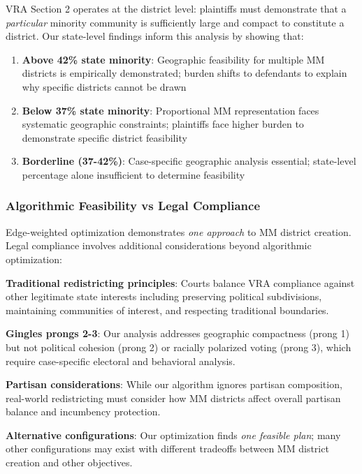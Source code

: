 VRA Section 2 operates at the district level: plaintiffs must demonstrate that a \emph{particular} minority community is sufficiently large and compact to constitute a district. Our state-level findings inform this analysis by showing that:

\begin{enumerate}
    \item \textbf{Above 42\% state minority}: Geographic feasibility for multiple MM districts is empirically demonstrated; burden shifts to defendants to explain why specific districts cannot be drawn
    \item \textbf{Below 37\% state minority}: Proportional MM representation faces systematic geographic constraints; plaintiffs face higher burden to demonstrate specific district feasibility
    \item \textbf{Borderline (37-42\%)}: Case-specific geographic analysis essential; state-level percentage alone insufficient to determine feasibility
\end{enumerate}

\subsubsection{Algorithmic Feasibility vs Legal Compliance}

Edge-weighted optimization demonstrates \emph{one approach} to MM district creation. Legal compliance involves additional considerations beyond algorithmic optimization:

\textbf{Traditional redistricting principles}: Courts balance VRA compliance against other legitimate state interests including preserving political subdivisions, maintaining communities of interest, and respecting traditional boundaries.

\textbf{Gingles prongs 2-3}: Our analysis addresses geographic compactness (prong 1) but not political cohesion (prong 2) or racially polarized voting (prong 3), which require case-specific electoral and behavioral analysis.

\textbf{Partisan considerations}: While our algorithm ignores partisan composition, real-world redistricting must consider how MM districts affect overall partisan balance and incumbency protection.

\textbf{Alternative configurations}: Our optimization finds \emph{one feasible plan}; many other configurations may exist with different tradeoffs between MM district creation and other objectives.

